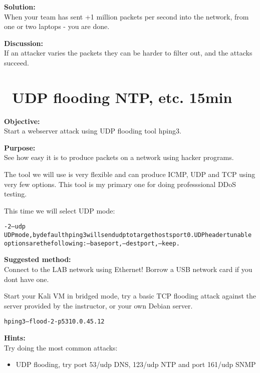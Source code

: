 \documentclass[a4paper,11pt,notitlepage]{report}
\begin{document}
{\bf Solution:}\\
When your team has sent +1 million packets per second into the network, from one or two laptops - you are done.

{\bf Discussion:}\\
If an attacker varies the packets they can be harder to filter out, and the attacks succeed.

\chapter{\faInfoCircle\ UDP flooding NTP, etc. 15min}


{\bf Objective:}\\
Start a webserver attack using UDP flooding tool hping3.

{\bf Purpose:}\\
See how easy it is to produce packets on a network using hacker programs.

The tool we will use is very flexible and can produce ICMP, UDP and TCP using very few options. This tool is my primary one for doing professsional DDoS testing.

This time we will select UDP mode:

\begin{alltt}\footnotesize
-2 --udp
       UDP mode, by default hping3 will send udp to target hosts port 0.  UDP header  tunable
       options are the following: --baseport, --destport, --keep.
\end{alltt}

{\bf Suggested method:}\\
Connect to the LAB network using Ethernet! Borrow a USB network card if you dont have one.

Start your Kali VM in bridged mode, try a basic TCP flooding attack against the server provided by the instructor, or your own Debian server.

\begin{alltt}\footnotesize
hping3 --flood -2 -p 53 10.0.45.12
\end{alltt}



{\bf Hints:}\\

Try doing the most common attacks:
\begin{itemize}
\item UDP flooding, try port 53/udp DNS, 123/udp NTP and port 161/udp SNMP
\end{itemize}
\end{document}
